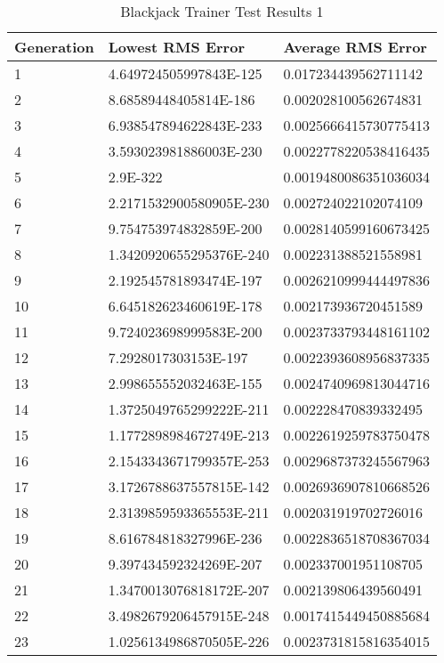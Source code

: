 \begin{center}
    \begin{longtable}{ | l | l | l |}
      \caption{Blackjack Trainer Test Results 1} \label{btr1} \\
    \hline
  Generation & Lowest RMS Error & Average RMS Error \\ \hline
1 &	4.649724505997843E-125 &	0.017234439562711142 \\ \hline
2 &	8.68589448405814E-186 &	0.002028100562674831 \\ \hline
3 &	6.938547894622843E-233 &	0.0025666415730775413 \\ \hline
4 &	3.593023981886003E-230 &	0.0022778220538416435 \\ \hline
5 &	2.9E-322	& 0.0019480086351036034 \\ \hline
6 &	2.2171532900580905E-230 &	0.002724022102074109 \\ \hline
7 &	9.754753974832859E-200 &	0.0028140599160673425 \\ \hline
8 &	1.3420920655295376E-240 &	0.002231388521558981 \\ \hline
9 &	2.192545781893474E-197 &	0.0026210999444497836 \\ \hline
10 &	6.645182623460619E-178 &	0.002173936720451589 \\ \hline
11 &	9.724023698999583E-200 &	0.0023733793448161102 \\ \hline
12 &	7.2928017303153E-197 &	0.0022393608956837335 \\ \hline
13 &	2.998655552032463E-155 &	0.0024740969813044716 \\ \hline
14 &	1.3725049765299222E-211 &	0.002228470839332495 \\ \hline
15 &	1.1772898984672749E-213 &	0.0022619259783750478 \\ \hline
16 &	2.1543343671799357E-253 &	0.0029687373245567963 \\ \hline
17 &	3.1726788637557815E-142 &	0.0026936907810668526 \\ \hline
18 &	2.3139859593365553E-211 &	0.002031919702726016 \\ \hline
19 &	8.616784818327996E-236 &	0.0022836518708367034 \\ \hline
20 &	9.397434592324269E-207 &	0.002337001951108705 \\ \hline
21 &	1.3470013076818172E-207 &	0.002139806439560491 \\ \hline
22 &	3.4982679206457915E-248 &	0.0017415449450885684 \\ \hline
23 &	1.0256134986870505E-226 &	0.0023731815816354015 \\ \hline

\end{longtable}
\end{center}

